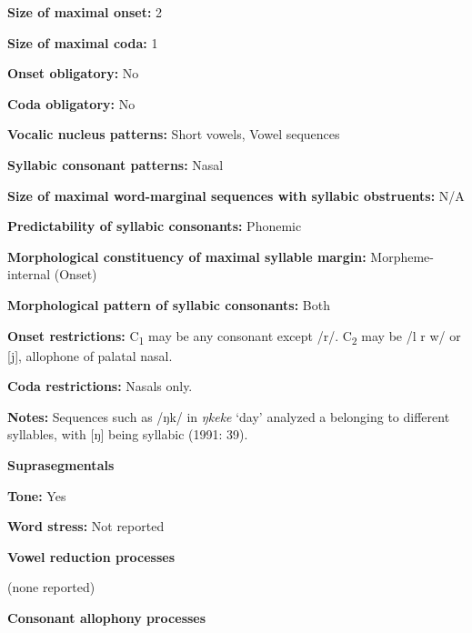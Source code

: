 \textbf{Size of maximal onset:} 2



\textbf{Size of maximal coda:} 1



\textbf{Onset obligatory:} No



\textbf{Coda obligatory:} No



\textbf{Vocalic nucleus patterns:} Short vowels, Vowel sequences



\textbf{Syllabic consonant patterns:} Nasal



\textbf{Size of maximal word{}-marginal sequences with syllabic obstruents:} N/A



\textbf{Predictability of syllabic consonants:} Phonemic



\textbf{Morphological constituency of maximal syllable margin:} Morpheme-internal (Onset)



\textbf{Morphological pattern of syllabic consonants:} Both



\textbf{Onset restrictions:} C\textsubscript{1} may be any consonant except /r/. C\textsubscript{2} may be /l r w/ or [j], allophone of palatal nasal.



\textbf{Coda restrictions:} Nasals only.



\textbf{Notes:} Sequences such as /ŋk/ in \textit{ŋkeke} ‘day’ analyzed a belonging to different syllables, with [ŋ] being syllabic (1991: 39).



\textbf{Suprasegmentals}



\textbf{Tone:} Yes



\textbf{Word stress:} Not reported



\textbf{Vowel reduction processes}



(none reported)



\textbf{Consonant allophony processes}



